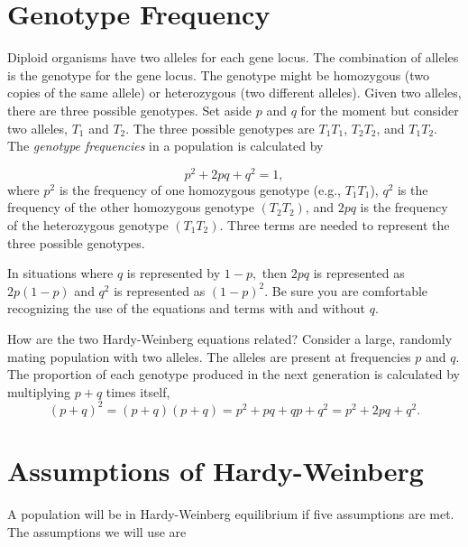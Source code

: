 \documentclass[letterpaper]{tufte-handout}
\begin{document}
\section*{Genotype Frequency}


Diploid organisms have two alleles for each gene locus. The combination of alleles is the genotype for the gene locus. The genotype might be homozygous (two copies of the same allele) or heterozygous (two different alleles).  Given two alleles, there are three possible genotypes. Set aside $p$ and $q$ for the moment but consider two alleles, $T_1$ and $T_2$. The three possible genotypes are $T_1T_1$, $T_2T_2$, and $T_1T_2$.  The \emph{genotype frequencies} in a population is calculated by

\begin{equation*}
p^2 + 2pq+q^2=1,
\end{equation*}
where $p^2$ is the frequency of one homozygous genotype (e.g., $T_1T_1$), $q^2$ is the frequency of the other homozygous genotype $(T_2T_2)$, and $2pq$ is the frequency of the heterozygous genotype $(T_1T_2)$.  Three terms are needed to represent the three possible genotypes. 

In situations where $q$ is represented by $1-p,$ then $2pq$ is represented as $2p(1-p)$ and $q^2$ is represented as $(1-p)^2.$ Be sure you are comfortable recognizing the use of the equations and terms with and without $q$.

How are the two Hardy-Weinberg equations related?  Consider a large, randomly mating population with two alleles.  The alleles are present at frequencies $p$ and $q$.  The proportion of each genotype produced in the next generation is calculated by multiplying $p+q$ times itself,
\begin{equation*}
(p+q)^2=
(p+q)(p+q) =
p^2 + pq + qp + q^2 =
p^2 + 2pq + q^2.
\end{equation*}

\section*{Assumptions of Hardy-Weinberg}

A population will be in Hardy-Weinberg equilibrium if five assumptions are met. The assumptions we will use are
\end{document}
